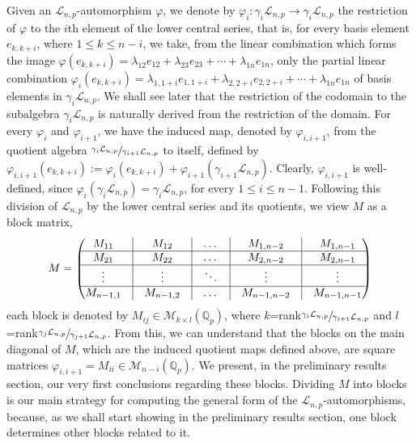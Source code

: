 \documentclass[12pt]{article}
\begin{document}
Given an $\mathcal{L}_{n,p}$-automorphism $\varphi$, we denote by $\varphi_i:\gamma_i\mathcal{L}_{n,p}\rightarrow\gamma_i\mathcal{L}_{n,p}$ the restriction of $\varphi$ to the $i$th element of the lower central series, that is, for every basis element $e_{k,k+i}$, where $1\leq k\leq n-i$, we take, from the linear combination which forms the image $\varphi(e_{k,k+i})=\lambda_{12}e_{12}+\lambda_{23}e_{23}+\cdots+\lambda_{1n}e_{1n}$, only the partial linear combination $\varphi_i(e_{k,k+i})=\lambda_{1,1+i}e_{1,1+i}+\lambda_{2,2+i}e_{2,2+i}+\cdots+\lambda_{1n}e_{1n}$ of basis elements in $\gamma_i\mathcal{L}_{n,p}$. We shall see later that the restriction of the codomain to the subalgebra $\gamma_i\mathcal{L}_{n,p}$ is naturally derived from the restriction of the domain. For every $\varphi_i$ and $\varphi_{i+1}$, we have the induced map, denoted by $\varphi_{i,i+1}$, from the quotient algebra $\sfrac{\gamma_i\mathcal{L}_{n,p}}{\gamma_{i+1}\mathcal{L}_{n,p}}$ to itself, defined by $\varphi_{i,i+1}(e_{k,k+i}):=\varphi_i(e_{k,k+i})+\varphi_{i+1}(\gamma_{i+1}\mathcal{L}_{n,p})$. Clearly, $\varphi_{i,i+1}$ is well-defined, since $\varphi_i(\gamma_i\mathcal{L}_{n,p})=\gamma_i\mathcal{L}_{n,p}$, for every $1\leq i\leq n-1$.
Following this division of $\mathcal{L}_{n,p}$ by the lower central series and its quotients, we view $M$ as a block matrix, $$M=\begin{pmatrix}
M_{11} & \vline & M_{12}&\vline & \dots& \vline & M_{1,n-2} & \vline&M_{1,n-1}\\
\hline
M_{21} & \vline & M_{22}&\vline & \dots &\vline & M_{2,n-2} &\vline& M_{2,n-1}\\
\hline
\vdots & \vline & \vdots&\vline & \ddots &\vline & \vdots &\vline& \vdots\\
\hline
M_{n-1,1} & \vline & M_{n-1,2}&\vline & \dots &\vline & M_{n-1,n-2} &\vline& M_{n-1,n-1}\\
\end{pmatrix}
$$
each block is denoted by $M_{ij}\in\mathcal{M}_{k\times l}(\mathbb{Q}_p)$, where $k$=rank$\sfrac{\gamma_i\mathcal{L}_{n,p}}{\gamma_{i+1}\mathcal{L}_{n,p}}$ and $l$=rank$\sfrac{\gamma_j\mathcal{L}_{n,p}}{\gamma_{j+1}\mathcal{L}_{n,p}}$. From this, we can understand that the blocks on the main diagonal of $M$, which are the induced quotient maps defined above, are square matrices $\varphi_{i,i+1}=M_{ii}\in\mathcal{M}_{n-i}(\mathbb{Q}_p)$. We present, in the preliminary results section, our very first conclusions regarding these blocks. Dividing $M$ into blocks is our main strategy for computing the general form of the $\mathcal{L}_{n,p}$-automorphisms, because, as we shall start showing in the preliminary results section, one block determines other blocks related to it.
\end{document}
